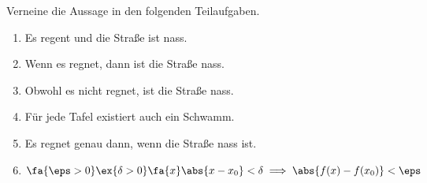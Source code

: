 \begin{exercise}
  Verneine die Aussage in den folgenden Teilaufgaben.
  \begin{enumerate}
  \item Es regent und die Straße ist nass.
  \item Wenn es regnet, dann ist die Straße nass.
  \item Obwohl es nicht regnet, ist die Straße nass.
  \item Für jede Tafel existiert auch ein Schwamm.
  \item Es regnet genau dann, wenn die Straße nass ist.
  \item $\fa{\eps > 0} \ex{\delta > 0} \fa{x} \abs{x - x_0} <
    \delta \implies \abs{f(x) - f(x_0)} < \eps$
  \end{enumerate}
\end{exercise}
